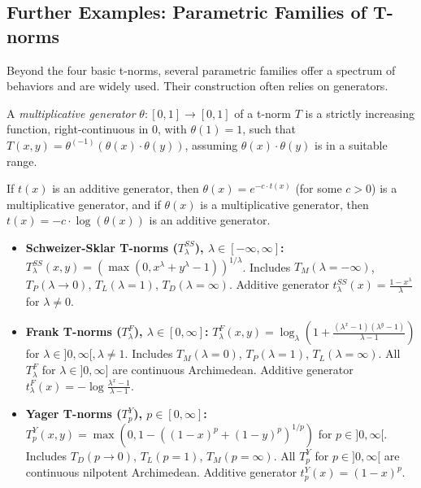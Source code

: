 \subsection{Further Examples: Parametric Families of T-norms}
Beyond the four basic t-norms, several parametric families offer a spectrum of behaviors and are widely used. Their construction often relies on generators.
\begin{definition}
  A \emph{multiplicative generator} $\theta: [0,1] \to [0,1]$ of a t-norm $T$ is a strictly increasing function, right-continuous in $0$, with $\theta(1)=1$, such that $T(x,y) = \theta^{(-1)}(\theta(x) \cdot \theta(y))$, assuming $\theta(x)\cdot\theta(y)$ is in a suitable range. 
\end{definition}
\begin{remark}
  If $t(x)$ is an additive generator, then $\theta(x) = e^{-c \cdot t(x)}$ (for some $c>0$) is a multiplicative generator, and if $\theta(x)$ is a multiplicative generator, then $t(x) = -c \cdot \log(\theta(x))$ is an additive generator.
\end{remark}

\begin{example}
  \begin{itemize}
    \item \textbf{Schweizer-Sklar T-norms ($T_\lambda^{SS}$), $\lambda \in [-\infty, \infty]$:}
    $T_\lambda^{SS}(x,y) = (\max(0, x^\lambda + y^\lambda - 1))^{1/\lambda}$.
    Includes $T_M (\lambda=-\infty)$, $T_P (\lambda \to 0)$, $T_L (\lambda=1)$, $T_D (\lambda=\infty)$. Additive generator $t_\lambda^{SS}(x) = \frac{1-x^\lambda}{\lambda}$ for $\lambda \neq 0$.
    \item \textbf{Frank T-norms ($T_\lambda^F$), $\lambda \in [0, \infty]$:}
    $T_\lambda^F(x,y) = \log_\lambda \left(1 + \frac{(\lambda^x-1)(\lambda^y-1)}{\lambda-1}\right)$ for $\lambda \in ]0,\infty[, \lambda \neq 1$.
    Includes $T_M (\lambda=0)$, $T_P (\lambda=1)$, $T_L (\lambda=\infty)$. All $T_\lambda^F$ for $\lambda \in ]0,\infty]$ are continuous Archimedean. Additive generator $t_\lambda^F(x) = -\log \frac{\lambda^x-1}{\lambda-1}$.
    \item \textbf{Yager T-norms ($T_p^Y$), $p \in [0, \infty]$:} 
    $T_p^Y(x,y) = \max(0, 1 - ((1-x)^p + (1-y)^p)^{1/p})$ for $p \in ]0,\infty[$.
    Includes $T_D (p \to 0)$, $T_L (p=1)$, $T_M (p=\infty)$. All $T_p^Y$ for $p \in ]0,\infty[$ are continuous nilpotent Archimedean. Additive generator $t_p^Y(x) = (1-x)^p$.
  \end{itemize}
\end{example}

